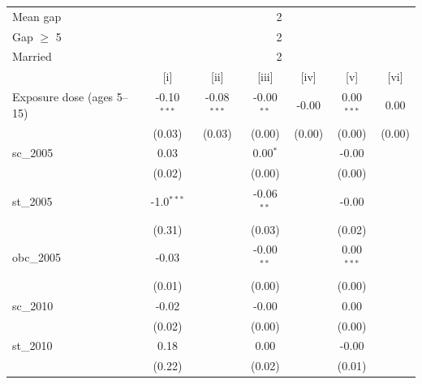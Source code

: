 {\centering\scriptsize
\begingroup
\begin{tabular}{@{}lcccccc@{}}
   \toprule
   Mean gap & \multicolumn{6}{c}{2} \\ 
   Gap $\geq$ 5 & \multicolumn{6}{c}{2} \\ 
   Married & \multicolumn{6}{c}{2} \\ 
                                                    & [i]           & [ii]          & [iii]         & [iv]          & [v]           & [vi]\\  
   \midrule 
   Exposure dose (ages 5--15)                       & -0.10$^{***}$ & -0.08$^{***}$ & -0.00$^{**}$ & -0.00        & 0.00$^{***}$ & 0.00\\   
                                                    & (0.03)        & (0.03)        & (0.00)       & (0.00)       & (0.00)       & (0.00)\\   
   sc\_2005                                         & 0.03          &               & 0.00$^{*}$   &               & -0.00        &   \\   
                                                    & (0.02)        &               & (0.00)       &               & (0.00)       &   \\   
   st\_2005                                         & -1.0$^{***}$  &               & -0.06$^{**}$  &               & -0.00        &   \\   
                                                    & (0.31)        &               & (0.03)        &               & (0.02)        &   \\   
   obc\_2005                                        & -0.03         &               & -0.00$^{**}$ &               & 0.00$^{***}$ &   \\   
                                                    & (0.01)        &               & (0.00)       &               & (0.00)      &   \\   
   sc\_2010                                         & -0.02         &               & -0.00        &               & 0.00        &   \\   
                                                    & (0.02)        &               & (0.00)       &               & (0.00)      &   \\   
   st\_2010                                         & 0.18          &               & 0.00         &               & -0.00        &   \\   
                                                    & (0.22)        &               & (0.02)        &               & (0.01)        &   \\   

\end{tabular}}
